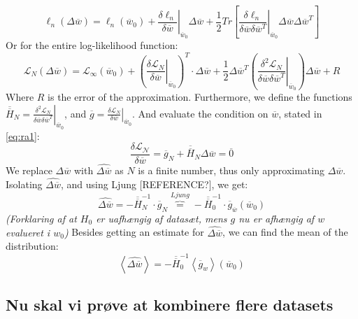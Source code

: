\begin{equation}
\ell_n(\Delta \overline{w}) = 
\ell_n\left(\overline{w}_0 \right) + 
\left. \frac{\delta \ell_n}{\delta \overline{w}} \right|_{\overline{w}_0} \Delta \overline{w} + 
\frac{1}{2} Tr \left[ \left. \frac{\delta \ell_n}{\delta \overline{w} \delta \overline{w}^T} \right|_{\overline{w}_0} \Delta \overline{w} \Delta \overline{w}^T \right] \label{eq:loglihood-oneObs}
\end{equation}
Or for the entire log-likelihood function:
\begin{equation}
\mathcal{L}_N(\Delta \overline{w}) = 
\mathcal{L}_\infty\left(\overline{w}_0\right) + 
\left(\left.\frac{\delta \mathcal{L}_N}{\delta \overline{w}}\right|_{\overline{w}_0} \right)^T \cdot \Delta \overline{w} +
\frac{1}{2} \Delta \overline{w}^T \left( \left. \frac{\delta^2 \mathcal{L}_N}{\delta \overline{w} \delta \overline{w}^T}\right|_{\overline{w}_0} \right) \Delta \overline{w} + R \label{eq:entireLogLike}
\end{equation}
Where $R$ is the error of the approximation. Furthermore, we define the functions $\overline{\overline{H}}_N = \left. \frac{\delta^2 \mathcal{L}_N}{\delta \overline{w} \delta \overline{w}^T}\right|_{\overline{w}_0}$, and $\overline{g} = \left.\frac{\delta \mathcal{L}_N}{\delta \overline{w}}\right|_{\overline{w}_0}$. And evaluate the condition on $\overline{w}$, stated in \eqref{eq:ra1}:
\begin{equation}
\frac{\delta \mathcal{L_N}}{\delta \overline{w}} = \overline{g}_N+\overline{\overline{H}}_N \Delta \overline{w} = \overline{0}
\end{equation}
We replace $\Delta \overline{w}$ with $\hat{\Delta \overline{w}}$  as $N$ is a finite number, thus only approximating $\Delta \overline{w}$. Isolating $\hat{\Delta \overline{w}}$, and using Ljung [REFERENCE?], we get:
\begin{equation}
\hat{\Delta \overline{w}} = - \overline{\overline{H}}_N^{-1} \cdot \overline{g}_N \overbrace{=}^{Ljung} -\overline{\overline{H}}
_0^{-1} \cdot \overline{g}_{\overline{w}} \left( \overline{w}_0 \right)
\end{equation}
\emph{(Forklaring af at $H_0$ er uafhængig af datasæt, mens $g$ nu er afhængig af $w$ evalueret i $w_0$)}
Besides getting an estimate for $\hat{\Delta \overline{w}}$, we can find the mean of the distribution:
\[
\left\langle \hat{\Delta \overline{w}} \right\rangle = - \overline{\overline{H}}_0^{-1} \left\langle \overline{g}_w \right\rangle (\overline{w}_0)
\]

\subsection*{Nu skal vi prøve at kombinere flere datasets}

